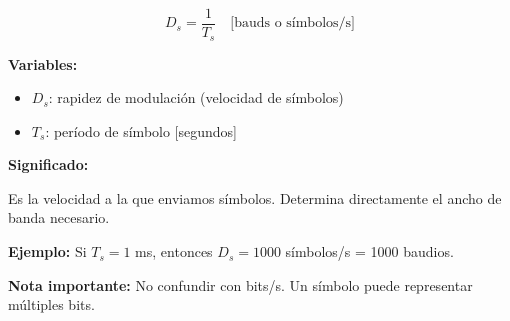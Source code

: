\documentclass[11pt,a4paper]{article}
\begin{document}
\begin{tcolorbox}[colback=verdeclaro!20,colframe=azuloscuro,title=\textbf{Rapidez de modulación (Symbol Rate)}]
$$\boxed{D_s = \frac{1}{T_s} \quad \text{[bauds o símbolos/s]}}$$

\textbf{Variables:}
\begin{itemize}
\item $D_s$: rapidez de modulación (velocidad de símbolos)
\item $T_s$: período de símbolo [segundos]
\end{itemize}

\textbf{Significado:}

Es la velocidad a la que enviamos símbolos. Determina directamente el ancho de banda necesario.

\textbf{Ejemplo:} Si $T_s = 1$ ms, entonces $D_s = 1000$ símbolos/s = 1000 baudios.

\textbf{Nota importante:} No confundir con bits/s. Un símbolo puede representar múltiples bits.
\end{tcolorbox}
\end{document}
